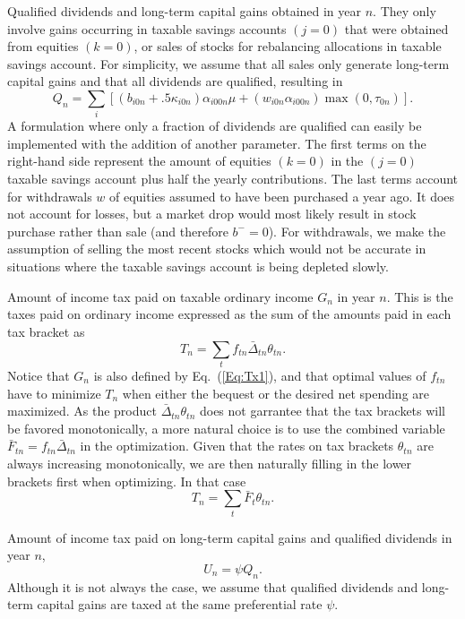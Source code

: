\documentclass{report}[fleqn,12pt]
\begin{document}
\begin{description}[leftmargin=4em,style=multiline]
\item [$Q_n$]
	Qualified dividends and long-term capital gains obtained in year $n$.
	They only involve gains occurring in taxable savings accounts $(j=0)$ that
	were obtained from equities $(k=0)$, or sales of stocks for rebalancing allocations
	in taxable savings account.
	For simplicity, we assume that all sales only generate long-term capital gains and
	that all dividends are qualified, resulting in
	\begin{equation}
		\label{Eq:Qx2}
		Q_n = \sum_{i} \left[(b_{i0n} + .5\kappa_{i0n})\alpha_{i00n}\mu +
		(w_{i0n}\alpha_{i00n}){\max(0, \tau_{0n})}\right].
	\end{equation}
	A formulation where only a fraction of dividends are qualified can easily be
	implemented with the addition of another parameter.
	The first terms on the right-hand side represent the amount of equities $(k=0)$ in the $(j=0)$
	taxable savings account plus
	half the yearly contributions. The last terms account for withdrawals $w$ of equities assumed
	to have been purchased a year ago. 
	It does not account for losses, but a market drop
	would most likely result in stock purchase rather than sale (and therefore $b^- = 0$).
	For withdrawals, we make the assumption of
	selling the most recent stocks which would not be accurate in situations where
	the taxable savings account is being depleted slowly.
\item [$T_n$]
	Amount of income tax paid on taxable ordinary income $G_n$ in year $n$.
	This is the taxes paid on ordinary income expressed as the sum of the amounts
	paid in each tax bracket as
	\begin{equation}
		\label{Eq:Tax}
		T_n = \sum_t f_{tn}\bar{\Delta}_{tn}\theta_{tn}.
	\end{equation}
	Notice that $G_n$ is also defined by Eq.~(\ref{Eq:Tx1}), and that optimal
	values of $f_{tn}$ have to
	minimize $T_n$ when either the bequest or the desired net spending are maximized.
	As the product $\bar{\Delta}_{tn}\theta_{tn}$ does not garrantee that the tax brackets
	will be favored monotonically, a more natural choice is to use the combined variable
	$\bar{F}_{tn} = f_{tn}\bar{\Delta}_{tn}$ in the optimization. Given that the rates on
	tax brackets $\theta_{tn}$ are always increasing monotonically, we are then naturally
	filling in the lower brackets first when optimizing. In that case
		\begin{equation}
			T_n = \sum_t \bar{F}_t \theta_{tn}.
		\end{equation}
\item [$U_n$]
	Amount of income tax paid on long-term capital gains and qualified dividends in year $n$,
	\begin{equation}
		U_n = \psi Q_n.
	\end{equation}
	Although it is not always the case, we assume that qualified dividends and long-term
	capital gains are taxed at the same preferential rate $\psi$.
\end{description}
\end{document}

